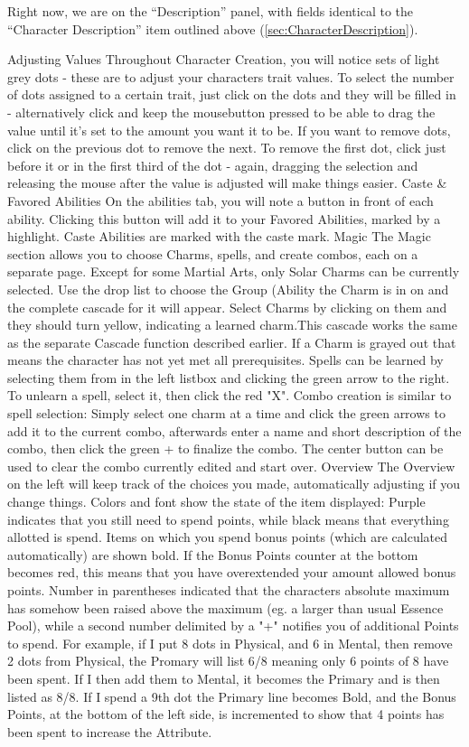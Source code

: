Right now, we are on the ``Description'' panel, with fields identical to the ``Character Description'' item outlined above (\ref{sec:CharacterDescription}).

Adjusting Values
Throughout Character Creation, you will notice sets of light grey dots - these are to adjust your characters trait values. To select the number of dots assigned to a certain trait, just click on the dots and they will be filled in - alternatively click and keep the mousebutton pressed to be able to drag the value until it's set to the amount you want it to be.
If you want to remove dots, click on the previous dot to remove the next. To remove the first dot, click just before it or in the first third of the dot - again, dragging the selection and releasing the mouse after the value is adjusted will make things easier.
Caste \& Favored Abilities
On the abilities tab, you will note a button in front of each ability. Clicking this button will add it to your Favored Abilities, marked by a highlight.
Caste Abilities are marked with the caste mark.
Magic
The Magic section allows you to choose Charms, spells, and create combos, each on a separate page. Except for some Martial Arts, only Solar Charms can be currently selected. Use the drop list to choose the Group (Ability the Charm is in on and the complete cascade for it will appear. Select Charms by clicking on them and they should turn yellow, indicating a learned charm.This cascade works the same as the separate Cascade function described earlier.
If a Charm is grayed out that means the character has not yet met all prerequisites.
Spells can be learned by selecting them from in the left listbox and clicking the green arrow to the right. To unlearn a spell, select it, then click the red "X".
Combo creation is similar to spell selection: Simply select one charm at a time and click the green arrows to add it to the current combo, afterwards enter a name and short description of the combo, then click the green + to finalize the combo. The center button can be used to clear the combo currently edited and start over.
Overview
The Overview on the left will keep track of the choices you made, automatically adjusting if you change things. Colors and font show the state of the item displayed:
Purple indicates that you still need to spend points, while black means that everything allotted is spend. Items on which you spend bonus points (which are calculated automatically) are shown bold. If the Bonus Points counter at the bottom becomes red, this means that you have overextended your amount allowed bonus points.
Number in parentheses indicated that the characters absolute maximum has somehow been raised above the maximum (eg. a larger than usual Essence Pool), while a second number delimited by a "+" notifies you of additional Points to spend.
For example, if I put 8 dots in Physical, and 6 in Mental, then remove 2 dots from Physical, the Promary will list 6/8 meaning only 6 points of 8 have been spent. If I then add them to Mental, it becomes the Primary and is then listed as 8/8. If I spend a 9th dot the Primary line becomes Bold, and the Bonus Points, at the bottom of the left side, is incremented to show that 4 points has been spent to increase the Attribute.

